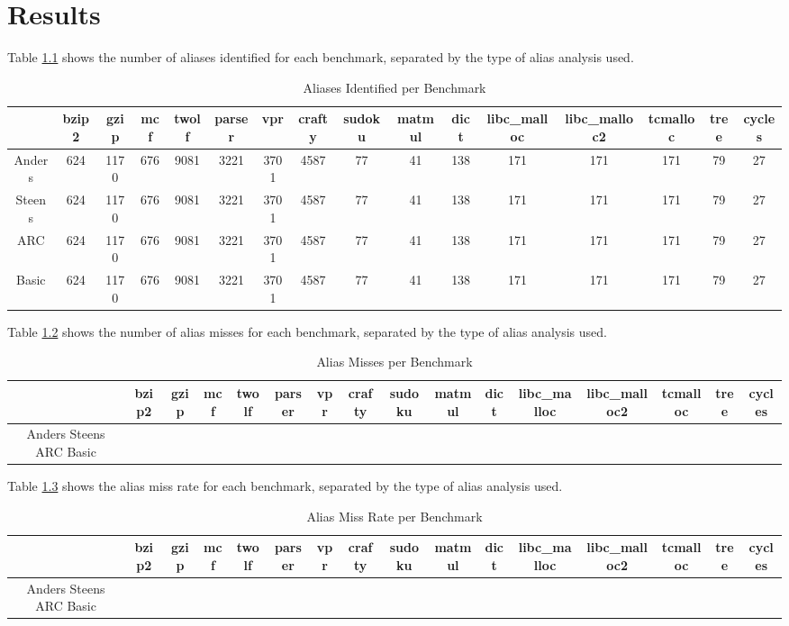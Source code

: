 \chapter{Results}

Table \ref{table:1} shows the number of aliases identified for each benchmark, separated by the type of alias analysis used.

\begin{table}
\centering
   \begin{tabular} {|c|c c c c c c c c c c c c c c c|}
      \hline
      & bzip2 & gzip & mcf & twolf & parser & vpr & crafty & sudoku & matmul & dict & libc_malloc & libc_malloc2 & tcmalloc & tree & cycles \\
      \hline
      Anders & 624 & 1170 & 676 & 9081 & 3221 & 3701 & 4587 & 77 & 41 & 138 & 171 & 171 & 171 & 79 & 27 \\
      \hline
      Steens & 624 & 1170 & 676 & 9081 & 3221 & 3701 & 4587 & 77 & 41 & 138 & 171 & 171 & 171 & 79 & 27 \\
      \hline
      ARC & 624 & 1170 & 676 & 9081 & 3221 & 3701 & 4587 & 77 & 41 & 138 & 171 & 171 & 171 & 79 & 27 \\
      \hline
      Basic & 624 & 1170 & 676 & 9081 & 3221 & 3701 & 4587 & 77 & 41 & 138 & 171 & 171 & 171 & 79 & 27 \\
      \hline
   \end{tabular}
   \caption{Aliases Identified per Benchmark}
   \label{table:1}
\end{table}

Table \ref{table:2} shows the number of alias misses for each benchmark, separated by the type of alias analysis used.

\begin{table}
\centering
   \begin{tabular} {|c|c c c c c c c c c c c c c c c|}
      \hline
      & bzip2 & gzip & mcf & twolf & parser & vpr & crafty & sudoku & matmul & dict & libc_malloc & libc_malloc2 & tcmalloc & tree & cycles \\
      \hline
      Anders
      \hline
      Steens
      \hline
      ARC
      \hline
      Basic
      \hline
   \end{tabular}
   \caption{Alias Misses per Benchmark}
   \label{table:2}
\end{table}

Table \ref{table:3} shows the alias miss rate for each benchmark, separated by the type of alias analysis used.

\begin{table}
\centering
   \begin{tabular} {|c|c c c c c c c c c c c c c c c|}
      \hline
      & bzip2 & gzip & mcf & twolf & parser & vpr & crafty & sudoku & matmul & dict & libc_malloc & libc_malloc2 & tcmalloc & tree & cycles \\
      \hline
      Anders
      \hline
      Steens
      \hline
      ARC
      \hline
      Basic
      \hline
   \end{tabular}
   \caption{Alias Miss Rate per Benchmark}
   \label{table:3}
\end{table}

